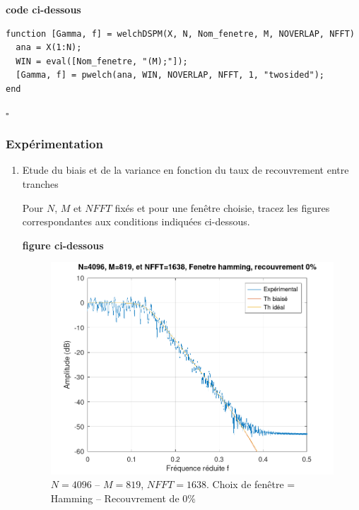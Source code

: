 \documentclass{article}
\newcommand{\debutrep}[1]{\color{blue}\begin{center} \hrulefill \textbf{ #1 } \hrulefill \end{center} }
\newcommand{\finrep}{\vspace*{5mm}\hfill $\square$\color{black}\vspace*{5mm}}
\begin{document}
\debutrep{code ci-dessous}
\begin{verbatim}
function [Gamma, f] = welchDSPM(X, N, Nom_fenetre, M, NOVERLAP, NFFT)
  ana = X(1:N);
  WIN = eval([Nom_fenetre, "(M);"]);
  [Gamma, f] = pwelch(ana, WIN, NOVERLAP, NFFT, 1, "twosided");
end
\end{verbatim}
\finrep

\subsubsection{Expérimentation}

\begin{enumerate}
\renewcommand{\theenumi}{\Alph{enumi}}

\item Etude du biais et de la variance en fonction du taux de recouvrement entre tranches

Pour $N$, $M$ et $NFFT$ fixés et pour une  fenêtre choisie,  tracez les figures correspondantes aux conditions indiquées ci-dessous.

\debutrep{figure ci-dessous}
\begin{figure}[H]
\includegraphics[width=\columnwidth]{Variation-recouvrement-0.png}
\caption{$N = 4096$ -- $M = 819$, $NFFT = 1638$. Choix de fenêtre = Hamming -- Recouvrement de $0\%$}
\end{figure}


\end{enumerate}
\end{document}
